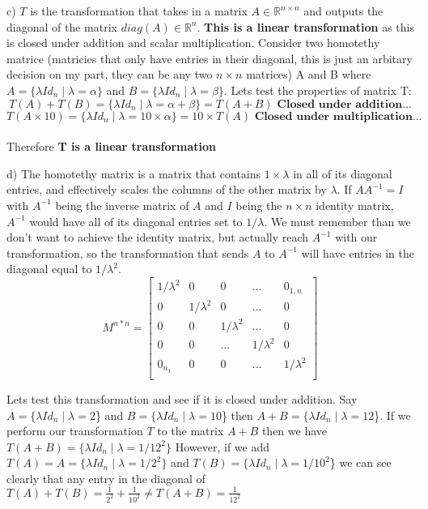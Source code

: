 \documentclass{article}
\begin{document}
\par
c) $T$ is the transformation that takes in a matrix $A \in \mathbb{R}^{n\times n}$ and outputs the diagonal of the matrix $diag(A) \in \mathbb{R}^{n}$. \textbf{This is a linear transformation} as this is closed under addition and scalar multiplication. Consider two homotethy matrice (matricies that only have entries in their diagonal, this is just an arbitary decision on my part, they can be any two $n\times n$ matrices) A and B where $A = \{ \lambda Id_n \mid \lambda = \alpha\}$ and $B = \{ \lambda Id_n \mid \lambda = \beta\}$. Lets test the properties of matrix T:
$$T(A) + T(B) = \{ \lambda Id_n \mid \lambda = \alpha + \beta \} = T(A+B) \textbf{ Closed under addition...}$$
$$T(A\times 10) = \{\lambda Id_n \mid \lambda = 10\times \alpha\} = 10 \times T(A) \textbf{ Closed under multiplication...}$$ \\
Therefore \textbf{T is a linear transformation}

\par
d) The homotethy matrix is a matrix that contains $1\times \lambda$ in all of its diagonal entries, and effectively scales the columns of the other matrix by $\lambda$. If $AA^{-1} = I$ with $A^{-1}$ being the inverse matrix of $A$ and $I$ being the $n\times n$ identity matrix, $A^{-1}$ would have all of its diagonal entries set to $1/\lambda$. We must remember than we don't want to achieve the identity matrix, but actually reach $A^{-1}$ with our transformation, so the transformation that sends $A$ to $A^{-1}$ will have entries in the diagonal equal to $1/\lambda^2$.
\[
M^{n*n}=
  \begin{bmatrix}
    1/\lambda^2 & 0 & 0 & \dots & 0_{1,n} \\
    0 & 1/\lambda^2 & 0 & \dots & 0 \\
    0 & 0 & 1/\lambda^2 & \dots & 0 \\
    0 & 0 & \dots & 1/\lambda^2 & 0 \\
    0_{n_1} & 0 & 0 & \dots & 1/\lambda^2 \\
  \end{bmatrix}
\]

Lets test this transformation and see if it is closed under addition. Say $A = \{ \lambda Id_n \mid \lambda = 2$\} and $B = \{ \lambda Id_n \mid \lambda = 10$\} then $A+B= \{ \lambda Id_n \mid \lambda = 12$\}. If we perform our transformation $T$ to the matrix $A+B$ then we have $T(A+B) = \{ \lambda Id_n \mid \lambda = 1/12^2\}$ However, if we add $T(A) = A = \{ \lambda Id_n \mid \lambda = 1/2^2\}$ and $T(B) = \{ \lambda Id_n \mid \lambda = 1/10^2$\} we can see clearly that any entry in the diagonal of $T(A) + T(B) = \frac{1}{2^2} + \frac{1}{10^2} \neq T(A+B) = \frac{1}{12^2}$
\end{document}
